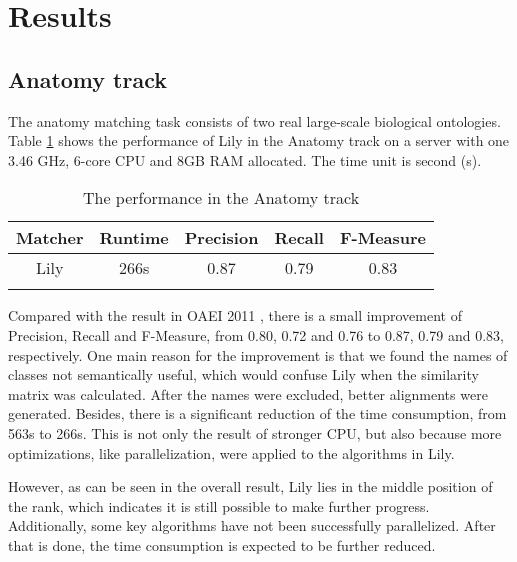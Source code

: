 \documentclass{llncs}
\begin{document}
\section{Results}
\subsection{Anatomy track}
The anatomy matching task consists of two real large-scale biological ontologies. Table \ref{tab:perf_anatomy} shows the performance of Lily in the Anatomy track on a server with one 3.46 GHz, 6-core CPU and 8GB RAM allocated. The time unit is second (s). \par
\begin{table}[H]
\caption{The performance in the Anatomy track} \label{tab:perf_anatomy}
\centering
\begin{tabular}{c|c|c|c|c}
\Xhline{1.5pt}
Matcher & Runtime & Precision & Recall & F-Measure \\ \hline
\Xhline{0.5pt}
Lily & 266s & 0.87 & 0.79 & 0.83 \\
\Xhline{1.5pt}
\end{tabular}
\end{table}
Compared with the result in OAEI 2011 \cite{lily_oaei2011}, there is a small improvement of Precision, Recall and F-Measure, from 0.80, 0.72 and 0.76 to 0.87, 0.79 and 0.83, respectively. One main reason for the improvement is that we found the names of classes not semantically useful, which would confuse Lily when the similarity matrix was calculated. After the names were excluded, better alignments were generated. Besides, there is a significant reduction of the time consumption, from 563s to 266s. This is not only the result of stronger CPU, but also because more optimizations, like parallelization, were applied to the algorithms in Lily. \par
However, as can be seen in the overall result, Lily lies in the middle position of the rank, which indicates it is still possible to make further progress. Additionally, some key algorithms have not been successfully parallelized. After that is done, the time consumption is expected to be further reduced. \par
\end{document}
